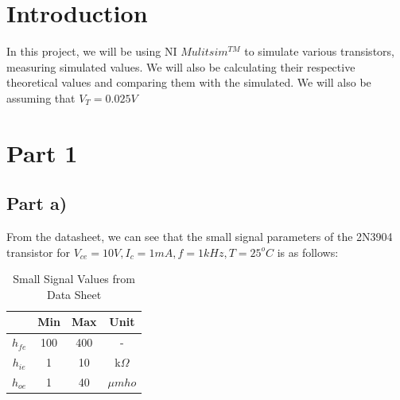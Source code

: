 \documentclass[12pt]{article}
\begin{document}
\pagebreak
{}
\tableofcontents
\pagebreak
\listoffigures
\listoftables
\pagebreak
{}
\section{Introduction}
In this project, we will be using NI $Mulitsim^{TM}$ to simulate various transistors, measuring simulated values. We will also be calculating their respective theoretical values and comparing them with the simulated. We will also be assuming that $V_T=0.025V$
\section{Part 1}
\subsection{Part a)}
From the datasheet, we can see that the small signal parameters of the 2N3904 transistor for $V_{ce}= 10V, I_c = 1mA, f=1kHz,T =  25^oC$ is as follows:  

\begin{table}[h!]
\centering
\begin{tabular}{|c c c c| }
 \hline
    & Min & Max & Unit \\
    \hline\hline
$h_{fe}$ & 100 & 400 & -\\
$h_{ie}$ & 1   & 10  & k$\Omega$\\
$h_{oe}$ & 1   & 40 & $\mu mho$\\
 \hline
\end{tabular}
\caption{Small Signal Values from Data Sheet}
\label{table:small signal}
\end{table}
\end{document}
